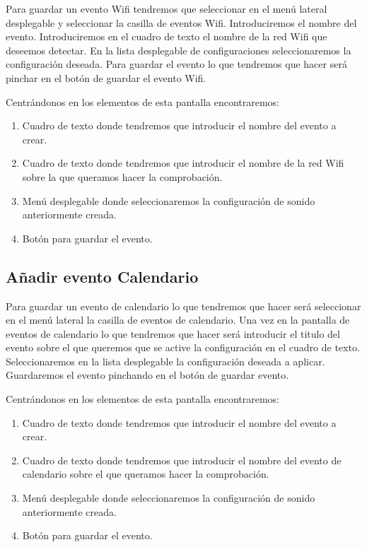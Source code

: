 Para guardar un evento Wifi tendremos que seleccionar en el menú lateral desplegable y seleccionar la casilla de eventos Wifi.
Introduciremos el nombre del evento.
Introduciremos en el cuadro de texto el nombre de la red Wifi que deseemos detectar.
En la lista desplegable de configuraciones seleccionaremos la configuración deseada.
Para guardar el evento lo que tendremos que hacer será pinchar en el botón de guardar el evento Wifi.

Centrándonos en los elementos de esta pantalla encontraremos:
\begin{enumerate}
\item Cuadro de texto donde tendremos que introducir el nombre del evento a crear.
\item Cuadro de texto donde tendremos que introducir el nombre de la red Wifi sobre la que queramos hacer la comprobación.
\item Menú desplegable donde seleccionaremos la configuración de sonido anteriormente creada.
\item Botón para guardar el evento.
\end{enumerate}


\subsection{Añadir evento Calendario}
Para guardar un evento de calendario lo que tendremos que hacer será seleccionar en el menú lateral la casilla de eventos de calendario.
Una vez en la pantalla de eventos de calendario lo que tendremos que hacer será introducir el titulo del evento sobre el que queremos que se active la configuración en el cuadro de texto.
Seleccionaremos en la lista desplegable la configuración deseada a aplicar.
Guardaremos el evento pinchando en el botón de guardar evento.

Centrándonos en los elementos de esta pantalla encontraremos:
\begin{enumerate}
\item Cuadro de texto donde tendremos que introducir el nombre del evento a crear.
\item Cuadro de texto donde tendremos que introducir el nombre del evento de calendario sobre el que queramos hacer la comprobación.
\item Menú desplegable donde seleccionaremos la configuración de sonido anteriormente creada.
\item Botón para guardar el evento.
\end{enumerate}

